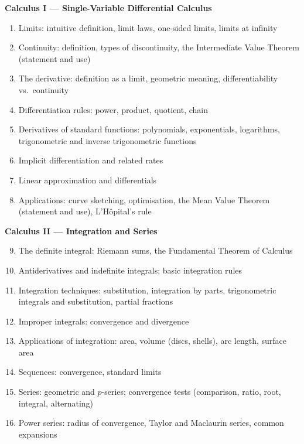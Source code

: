 \medskip
\noindent\textbf{Calculus I --- Single-Variable Differential Calculus}
\begin{enumerate}
  \item Limits: intuitive definition, limit laws, one-sided limits,
        limits at infinity
  \item Continuity: definition, types of discontinuity, the
        Intermediate Value Theorem (statement and use)
  \item The derivative: definition as a limit, geometric meaning,
        differentiability vs.\ continuity
  \item Differentiation rules: power, product, quotient, chain
  \item Derivatives of standard functions: polynomials,
        exponentials, logarithms, trigonometric and inverse
        trigonometric functions
  \item Implicit differentiation and related rates
  \item Linear approximation and differentials
  \item Applications: curve sketching, optimisation, the Mean
        Value Theorem (statement and use), L'H\^opital's rule
\end{enumerate}

\medskip
\noindent\textbf{Calculus II --- Integration and Series}
\begin{enumerate}
  \setcounter{enumi}{8}
  \item The definite integral: Riemann sums, the Fundamental
        Theorem of Calculus
  \item Antiderivatives and indefinite integrals; basic
        integration rules
  \item Integration techniques: substitution, integration by
        parts, trigonometric integrals and substitution,
        partial fractions
  \item Improper integrals: convergence and divergence
  \item Applications of integration: area, volume (discs,
        shells), arc length, surface area
  \item Sequences: convergence, standard limits
  \item Series: geometric and $p$-series; convergence tests
        (comparison, ratio, root, integral, alternating)
  \item Power series: radius of convergence, Taylor and
        Maclaurin series, common expansions
\end{enumerate}

